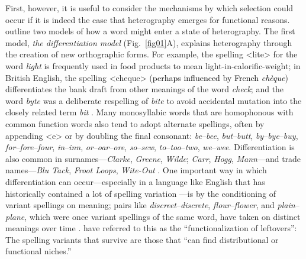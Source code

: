 \documentclass[doc,biblatex]{apa7}
\newcommand\firstrevision[1]{\textcolor{black}{#1}}
\begin{document}
First, however, it is useful to consider the mechanisms by which selection could occur if it is indeed the case that heterography emerges for functional reasons. \textcite[pp.~325--326]{Berg:2021} outline two models of how a word might enter a state of heterography. The first model, \textit{the differentiation model} (Fig.~\ref{fig01}A), explains heterography through the creation of new orthographic forms. For example, the spelling <lite> for the word \textit{light} is frequently used in food products to mean light-in-calorific-weight; in British English, the spelling <cheque> (\firstrevision{perhaps influenced by French \textit{chèque}}) differentiates the bank draft from other meanings of the word \textit{check}; and the word \textit{byte} was a deliberate respelling of \textit{bite} to avoid accidental mutation into the closely related term \textit{bit} \parencite{Buchholz:1977}. Many monosyllabic words that are homophonous with common function words also tend to adopt alternate spellings, often by appending <e> or by doubling the final consonant: \textit{be}--\textit{bee}, \textit{but}--\textit{butt}, \textit{by}--\textit{bye}--\textit{buy}, \textit{for}--\textit{fore}--\textit{four}, \textit{in}--\textit{inn}, \textit{or}--\textit{oar}--\textit{ore}, \textit{so}--\textit{sew}, \textit{to}--\textit{too}--\textit{two}, \textit{we}--\textit{wee}. Differentiation is also common in surnames---\textit{Clarke}, \textit{Greene}, \textit{Wilde}; \textit{Carr}, \textit{Hogg}, \textit{Mann}---and trade names---\textit{Blu Tack}, \textit{Froot Loops}, \textit{Wite-Out} \parencite[§~6]{Carney:1994}. One important way in which differentiation can occur---especially in a language like English that has historically contained a lot of spelling variation \parencite{Nevalainen:2012, Stenroos:2016}---is by the conditioning of variant spellings on meaning; pairs like \textit{discreet}--\textit{discrete}, \textit{flour}--\textit{flower}, and \textit{plain}--\textit{plane}, which were once variant spellings of the same word, have taken on distinct meanings over time \parencite[§~5.4]{Carney:1994}. \textcite[p.~58]{Berg:2017} have referred to this as the ``functionalization of leftovers'': The spelling variants that survive are those that ``can find distributional or functional niches.''
\end{document}
